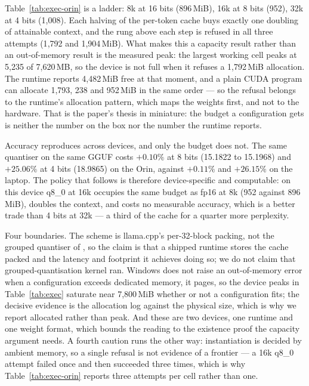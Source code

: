 \documentclass[5p]{elsarticle}
\begin{document}
Table~\ref{tab:exec-orin} is a ladder: 8k at 16 bits (896\,MiB), 16k at 8 bits
(952), 32k at 4 bits (1{,}008). Each halving of the per-token cache buys exactly one
doubling of attainable context, and the rung above each step is refused in all three
attempts (1{,}792 and 1{,}904\,MiB). What makes this a capacity result rather than
an out-of-memory result is the measured peak: the largest working cell peaks at
5{,}235 of 7{,}620\,MB, so the device is not full when it refuses a 1{,}792\,MiB
allocation. The runtime reports 4{,}482\,MiB free at that moment, and a plain CUDA
program can allocate 1{,}793, 238 and 952\,MiB in the same order --- so the refusal
belongs to the runtime's allocation pattern, which maps the weights first, and not
to the hardware. That is the paper's thesis in miniature: the budget a configuration
gets is neither the number on the box nor the number the runtime reports.

Accuracy reproduces across devices, and only the budget does not. The same quantiser
on the same GGUF costs $+0.10\%$ at 8 bits (15.1822 to 15.1968) and $+25.06\%$ at 4
bits (18.9865) on the Orin, against $+0.11\%$ and $+26.15\%$ on the laptop. The policy
that follows is therefore device-specific and computable: on this device q8\_0 at 16k
occupies the same budget as fp16 at 8k (952 against 896\,MiB), doubles the context,
and costs no measurable accuracy, which is a better trade than 4 bits at 32k --- a
third of the cache for a quarter more perplexity.

Four boundaries. The scheme is llama.cpp's per-32-block packing, not the grouped
quantiser of \cite{kivi}, so the claim is that a shipped runtime stores the cache
packed and the latency and footprint it achieves doing so; we do not claim that
grouped-quantisation kernel ran. Windows does not raise an out-of-memory error when
a configuration exceeds dedicated memory, it pages, so the device peaks in
Table~\ref{tab:exec} saturate near 7{,}800\,MiB whether or not a configuration
fits; the decisive evidence is the allocation log against the physical size, which
is why we report allocated rather than peak. And these are two devices, one runtime
and one weight format, which bounds the reading to the existence proof the capacity
argument needs. A fourth caution runs the other way: instantiation is decided by
ambient memory, so a single refusal is not evidence of a frontier --- a 16k q8\_0 attempt
failed once and then succeeded three times, which is why Table~\ref{tab:exec-orin} reports
three attempts per cell rather than one.
\end{document}
